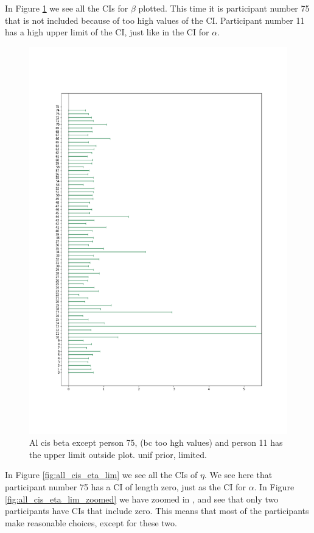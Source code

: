 In Figure \ref{fig:all_cis_beta} we see all the CIs for $\beta$ plotted. This time it is participant number 75 that is not included because of too high values of the CI.  Participant number 11 has a high upper limit of the CI, just like in the CI for $\alpha$.

\begin{figure}
    \centering
    \includegraphics[scale=0.38]{pictures/all_cis_lim_beta.png}
    \caption{Al cis beta except person 75, (bc too hgh values) and person 11 has the upper limit outside plot. unif prior, limited.}
    \label{fig:all_cis_beta}
\end{figure}

In Figure \ref{fig:all_cis_eta_lim} we see all the CIs of $\eta$. We see here that participant number 75 has a CI of length zero, just as the CI for $\alpha$. In Figure \ref{fig:all_cis_eta_lim_zoomed} we have zoomed in , and see that only two participants have CIs that include zero. This means that most of the participants make reasonable choices, except for these two. 

